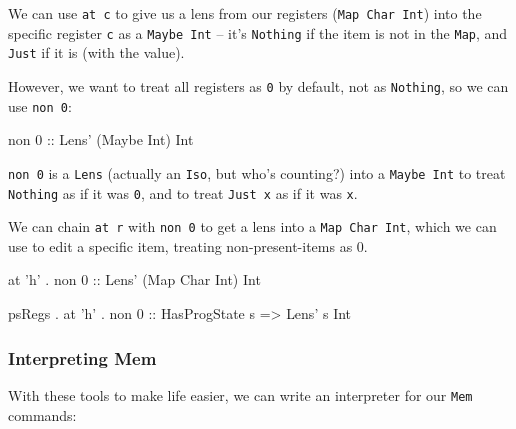 \documentclass[]{article}
\newenvironment{Shaded}{}{}
\newcommand{\CharTok}[1]{\textcolor[rgb]{0.25,0.44,0.63}{#1}}
\newcommand{\DataTypeTok}[1]{\textcolor[rgb]{0.56,0.13,0.00}{#1}}
\newcommand{\DecValTok}[1]{\textcolor[rgb]{0.25,0.63,0.44}{#1}}
\newcommand{\FunctionTok}[1]{\textcolor[rgb]{0.02,0.16,0.49}{#1}}
\newcommand{\NormalTok}[1]{#1}
\newcommand{\OtherTok}[1]{\textcolor[rgb]{0.00,0.44,0.13}{#1}}
\begin{document}
We can use \texttt{at\ \textquotesingle{}c\textquotesingle{}} to give us a lens
from our registers (\texttt{Map\ Char\ Int}) into the specific register
\texttt{\textquotesingle{}c\textquotesingle{}} as a \texttt{Maybe\ Int} -- it's
\texttt{Nothing} if the item is not in the \texttt{Map}, and \texttt{Just} if it
is (with the value).

However, we want to treat all registers as \texttt{0} by default, not as
\texttt{Nothing}, so we can use \texttt{non\ 0}:

\begin{Shaded}
\begin{Highlighting}[]
\NormalTok{non }\DecValTok{0}\OtherTok{ ::} \DataTypeTok{Lens'}\NormalTok{ (}\DataTypeTok{Maybe} \DataTypeTok{Int}\NormalTok{) }\DataTypeTok{Int}
\end{Highlighting}
\end{Shaded}

\texttt{non\ 0} is a \texttt{Lens} (actually an \texttt{Iso}, but who's
counting?) into a \texttt{Maybe\ Int} to treat \texttt{Nothing} as if it was
\texttt{0}, and to treat \texttt{Just\ x} as if it was \texttt{x}.

We can chain \texttt{at\ r} with \texttt{non\ 0} to get a lens into a
\texttt{Map\ Char\ Int}, which we can use to edit a specific item, treating
non-present-items as 0.

\begin{Shaded}
\begin{Highlighting}[]
\NormalTok{         at }\CharTok{'h'} \FunctionTok{.}\NormalTok{ non }\DecValTok{0}\OtherTok{ ::} \DataTypeTok{Lens'}\NormalTok{ (}\DataTypeTok{Map} \DataTypeTok{Char} \DataTypeTok{Int}\NormalTok{) }\DataTypeTok{Int}

\NormalTok{psRegs }\FunctionTok{.}\NormalTok{ at }\CharTok{'h'} \FunctionTok{.}\NormalTok{ non }\DecValTok{0}\OtherTok{ ::} \DataTypeTok{HasProgState}\NormalTok{ s }\OtherTok{=>} \DataTypeTok{Lens'}\NormalTok{ s }\DataTypeTok{Int}
\end{Highlighting}
\end{Shaded}

\hypertarget{interpreting-mem}{%
\subsubsection{Interpreting Mem}\label{interpreting-mem}}

With these tools to make life easier, we can write an interpreter for our
\texttt{Mem} commands:
\end{document}
